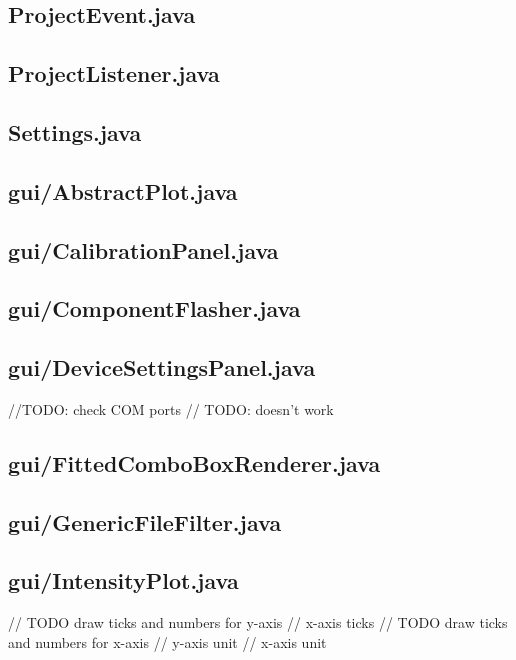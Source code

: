 \subsection{ProjectEvent.java}

\subsection{ProjectListener.java}

\subsection{Settings.java}

\subsection{gui/AbstractPlot.java}

\subsection{gui/CalibrationPanel.java}

\subsection{gui/ComponentFlasher.java}

\subsection{gui/DeviceSettingsPanel.java}
            //TODO: check COM ports
            // TODO: doesn't work

\subsection{gui/FittedComboBoxRenderer.java}

\subsection{gui/GenericFileFilter.java}

\subsection{gui/IntensityPlot.java}
        // TODO draw ticks and numbers for y-axis
        // x-axis ticks
        // TODO draw ticks and numbers for x-axis
        // y-axis unit
        // x-axis unit

